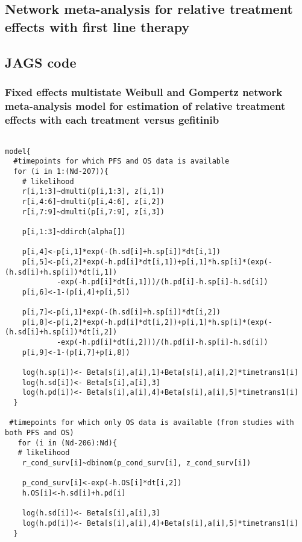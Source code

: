 \documentclass[11pt,final,fleqn]{article}\usepackage[]{graphicx}\usepackage[]{color}
\theoremstyle{plain}
\begin{document}
\begin{appendices}




\section{Network meta-analysis for relative treatment effects with first line therapy}
\subsection{JAGS code}\label{sec:1l-nma-jags}

\subsubsection{Fixed effects multistate Weibull and Gompertz network meta-analysis model for estimation of relative treatment effects with each treatment versus gefitinib} 

\begin{verbatim} 

model{
  #timepoints for which PFS and OS data is available
  for (i in 1:(Nd-207)){
    # likelihood
    r[i,1:3]~dmulti(p[i,1:3], z[i,1]) 
    r[i,4:6]~dmulti(p[i,4:6], z[i,2]) 
    r[i,7:9]~dmulti(p[i,7:9], z[i,3]) 
    
    p[i,1:3]~ddirch(alpha[])
    
    p[i,4]<-p[i,1]*exp(-(h.sd[i]+h.sp[i])*dt[i,1])
    p[i,5]<-p[i,2]*exp(-h.pd[i]*dt[i,1])+p[i,1]*h.sp[i]*(exp(-(h.sd[i]+h.sp[i])*dt[i,1])
    		-exp(-h.pd[i]*dt[i,1]))/(h.pd[i]-h.sp[i]-h.sd[i])
    p[i,6]<-1-(p[i,4]+p[i,5])
    
    p[i,7]<-p[i,1]*exp(-(h.sd[i]+h.sp[i])*dt[i,2])
    p[i,8]<-p[i,2]*exp(-h.pd[i]*dt[i,2])+p[i,1]*h.sp[i]*(exp(-(h.sd[i]+h.sp[i])*dt[i,2])
    		-exp(-h.pd[i]*dt[i,2]))/(h.pd[i]-h.sp[i]-h.sd[i])
    p[i,9]<-1-(p[i,7]+p[i,8])
    
    log(h.sp[i])<- Beta[s[i],a[i],1]+Beta[s[i],a[i],2]*timetrans1[i] 
    log(h.sd[i])<- Beta[s[i],a[i],3] 
    log(h.pd[i])<- Beta[s[i],a[i],4]+Beta[s[i],a[i],5]*timetrans1[i]
  }
  
 #timepoints for which only OS data is available (from studies with both PFS and OS)
   for (i in (Nd-206):Nd){
   # likelihood
    r_cond_surv[i]~dbinom(p_cond_surv[i], z_cond_surv[i]) 
    
    p_cond_surv[i]<-exp(-h.OS[i]*dt[i,2])
    h.OS[i]<-h.sd[i]+h.pd[i]
    
    log(h.sd[i])<- Beta[s[i],a[i],3] 
    log(h.pd[i])<- Beta[s[i],a[i],4]+Beta[s[i],a[i],5]*timetrans1[i]
  }
    

\end{verbatim}
\end{appendices}
\end{document}
